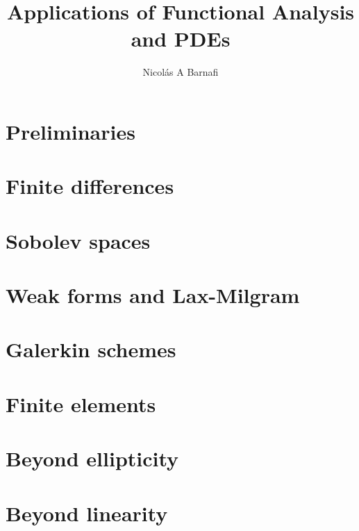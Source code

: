 \documentclass{scrbook}
\title{Applications of Functional Analysis and PDEs}
\author{Nicol\'as A Barnafi}
\date{} %
\begin{document}
\maketitle
\tableofcontents
\mainmatter



\chapter{Preliminaries}\label{chapter:preliminaries}

\chapter{Finite differences}\label{chapter:finite-differences}

\chapter{Sobolev spaces}\label{chapter:sobolev}

\chapter{Weak forms and Lax-Milgram}\label{chapter:weak-forms-lax-milgram}

\chapter{Galerkin schemes}\label{chapter:galerkin}

\chapter{Finite elements}\label{chapter:fem}

\chapter{Beyond ellipticity}\label{chapter:beyond-ellipticity}

\chapter{Beyond linearity}\label{sec:nonlinear}

\end{document}
